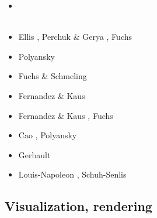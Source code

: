 \begin{scriptsize}
\begin{itemize}
\item[\twothousandeight] 
\cite{buge08} \cite{buge08}\\
\cite{zlfd08} \cite{zlfd08}\\
\item[\twothousandeleven] Ellis \etal \cite{ellw11}, Perchuk \& Gerya \cite{pege11},
                          Fuchs \etal \cite{fusk11}
\item[\twothousandtwelve] Polyansky \etal \cite{pokb12}
\item[\twothousandthirteen] Fuchs \& Schmeling \cite{fusc13}
\item[\twothousandfourteen] Fernandez \& Kaus \cite{feka14b}
\item[\twothousandfifteen] Fernandez \& Kaus \cite{feka15}, Fuchs \etal \cite{fuks15}
\item[\twothousandsixteen] Cao \etal \cite{cakp16}, Polyansky \etal \cite{porb16}
\item[\twothousandeighteen] Gerbault \etal \cite{gesr18}
\item[\twothousandtwenty] Louis-Napoleon \etal \cite{logb20}, Schuh-Senlis \etal \cite{sctc20}
\end{itemize}
\end{scriptsize}

\subsection{Visualization, rendering}

